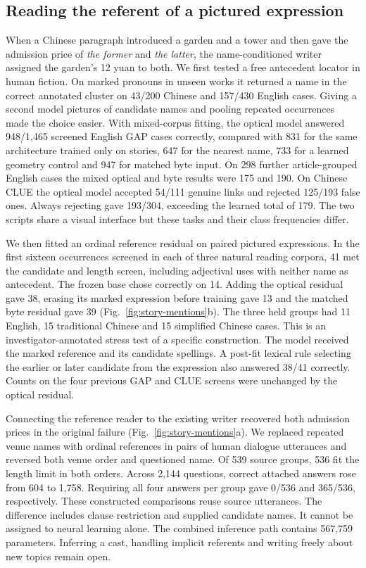 \subsection*{Reading the referent of a pictured expression}
When a Chinese paragraph introduced a garden and a tower and then gave the admission price of \emph{the former} and \emph{the latter}, the name-conditioned writer assigned the garden's 12 yuan to both. We first tested a free antecedent locator in human fiction. On marked pronouns in unseen works it returned a name in the correct annotated cluster on 43/200 Chinese and 157/430 English cases. Giving a second model pictures of candidate names and pooling repeated occurrences made the choice easier. With mixed-corpus fitting, the optical model answered 948/1,465 screened English GAP cases correctly, compared with 831 for the same architecture trained only on stories, 647 for the nearest name, 733 for a learned geometry control and 947 for matched byte input. On 298 further article-grouped English cases the mixed optical and byte results were 175 and 190. On Chinese CLUE the optical model accepted 54/111 genuine links and rejected 125/193 false ones. Always rejecting gave 193/304, exceeding the learned total of 179. The two scripts share a visual interface but these tasks and their class frequencies differ.

We then fitted an ordinal reference residual on paired pictured expressions. In the first sixteen occurrences screened in each of three natural reading corpora, 41 met the candidate and length screen, including adjectival uses with neither name as antecedent. The frozen base chose correctly on 14. Adding the optical residual gave 38, erasing its marked expression before training gave 13 and the matched byte residual gave 39 (Fig.~\ref{fig:story-mentions}b). The three held groups had 11 English, 15 traditional Chinese and 15 simplified Chinese cases. This is an investigator-annotated stress test of a specific construction. The model received the marked reference and its candidate spellings. A post-fit lexical rule selecting the earlier or later candidate from the expression also answered 38/41 correctly. Counts on the four previous GAP and CLUE screens were unchanged by the optical residual.

Connecting the reference reader to the existing writer recovered both admission prices in the original failure (Fig.~\ref{fig:story-mentions}a). We replaced repeated venue names with ordinal references in pairs of human dialogue utterances and reversed both venue order and questioned name. Of 539 source groups, 536 fit the length limit in both orders. Across 2,144 questions, correct attached answers rose from 604 to 1,758. Requiring all four answers per group gave 0/536 and 365/536, respectively. These constructed comparisons reuse source utterances. The difference includes clause restriction and supplied candidate names. It cannot be assigned to neural learning alone. The combined inference path contains 567,759 parameters. Inferring a cast, handling implicit referents and writing freely about new topics remain open.

